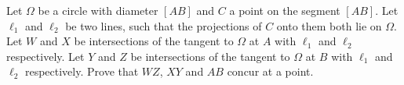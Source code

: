 Let $\Omega$ be a circle with diameter $[AB]$ and $C$ a point on the segment $[AB]$.
Let $\ell_1$ and $\ell_2$ be two lines,
such that the projections of $C$ onto them both lie on $\Omega$.
Let $W$ and $X$ be intersections of the tangent to $\Omega$ at $A$
with $\ell_1$ and $\ell_2$ respectively.
Let $Y$ and $Z$ be intersections of the tangent to $\Omega$ at $B$
with $\ell_1$ and $\ell_2$ respectively.
Prove that $WZ$, $XY$ and $AB$ concur at a point.
